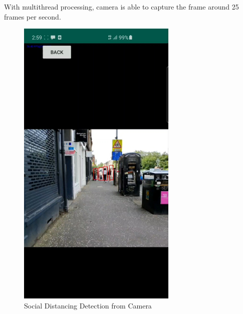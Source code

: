         With multithread processing, camera is able to capture the frame around 25 frames per second.

        \begin{figure}[!ht]
            \includegraphics[width=3in]{images/chapter5/application/camera-detection.jpg}
            \caption{Social Distancing Detection from Camera}
            \label{result:camera}
        \end{figure}